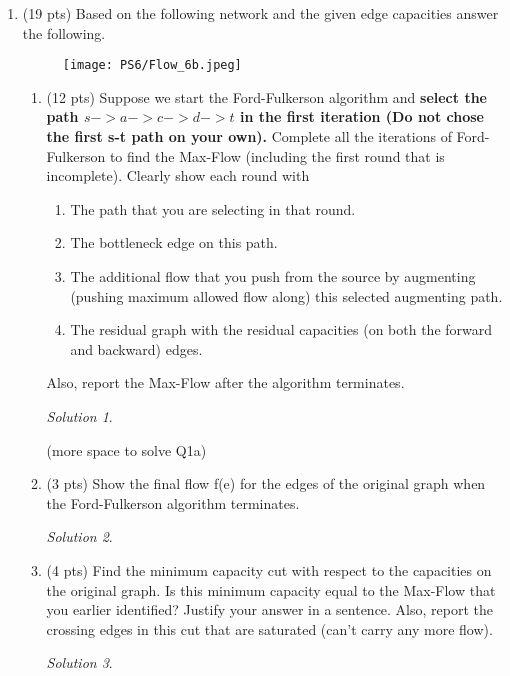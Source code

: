 \documentclass[12pt]{article}
\theoremstyle{remark}
\newtheorem*{solution}{Solution}
\begin{document}
\hrulefill

\newpage
\begin{enumerate}




\item (19 pts) Based on the following network and the given edge capacities answer the following. 
\begin{figure}[h!]
\begin{center}
\texttt{[image: PS6/Flow\_6b.jpeg]}
\end{center}
\end{figure}

\begin{enumerate}
\item (12 pts) Suppose we start the Ford-Fulkerson algorithm and \textbf{select the path $s->a->c->d->t$ in the first iteration (Do not chose the first s-t path on your own).} Complete all the iterations of Ford-Fulkerson to find the Max-Flow (including the first round that is incomplete).
Clearly show each round with \\
\begin{enumerate}
\item The path that you are selecting in that round.
\item The bottleneck edge on this path.
\item The additional flow that you push from the source by augmenting (pushing maximum allowed flow along) this selected augmenting path.
\item The residual graph with the residual capacities (on both the forward and backward) edges.
\end{enumerate}
Also, report the Max-Flow after the algorithm terminates.

\begin{solution}

\end{solution}

\pagebreak
(more space to solve Q1a)
\pagebreak

\item (3 pts) Show the final flow f(e) for the edges of the original graph when the Ford-Fulkerson algorithm terminates.
\begin{solution}

\end{solution}

\item (4 pts) Find the minimum capacity cut with respect to the capacities on the original graph. Is this minimum capacity equal to the Max-Flow that you earlier identified? Justify your answer in a sentence. Also, report the crossing edges in this cut that are saturated (can't carry any more flow).
\begin{solution}


\end{solution}
\end{enumerate}
\end{enumerate}
\end{document}
